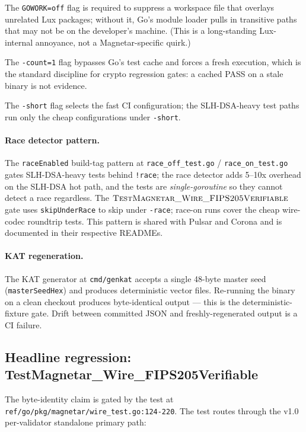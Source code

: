 The \texttt{GOWORK=off} flag is required to suppress a workspace
file that overlays unrelated Lux packages; without it, Go's module
loader pulls in transitive paths that may not be on the developer's
machine. (This is a long-standing Lux-internal annoyance, not a
Magnetar-specific quirk.)

The \texttt{-count=1} flag bypasses Go's test cache and forces a
fresh execution, which is the standard discipline for crypto
regression gates: a cached PASS on a stale binary is not evidence.

The \texttt{-short} flag selects the fast CI configuration; the
SLH-DSA-heavy test paths run only the cheap configurations under
\texttt{-short}.

\paragraph{Race detector pattern.} The \texttt{raceEnabled}
build-tag pattern at \texttt{race\_off\_test.go} /
\texttt{race\_on\_test.go} gates SLH-DSA-heavy tests behind
\texttt{!race}; the race detector adds 5--10x overhead on the
SLH-DSA hot path, and the tests are \emph{single-goroutine} so they
cannot detect a race regardless. The
$\textsc{TestMagnetar\_Wire\_FIPS205Verifiable}$ gate uses
\texttt{skipUnderRace} to skip under \texttt{-race}; race-on runs
cover the cheap wire-codec roundtrip tests. This pattern is shared
with Pulsar and Corona and is documented in their respective
READMEs.

\paragraph{KAT regeneration.} The KAT generator at
\texttt{cmd/genkat} accepts a single 48-byte master seed
(\texttt{masterSeedHex}) and produces deterministic vector files.
Re-running the binary on a clean checkout produces byte-identical
output --- this is the deterministic-fixture gate. Drift between
committed JSON and freshly-regenerated output is a CI failure.

\subsection{Headline regression: TestMagnetar\_Wire\_FIPS205Verifiable}
\label{sec:impl:wirefips}

The byte-identity claim is gated by the test at
\texttt{ref/go/pkg/magnetar/wire\_test.go:124-220}. The test routes
through the v1.0 per-validator standalone primary path:


